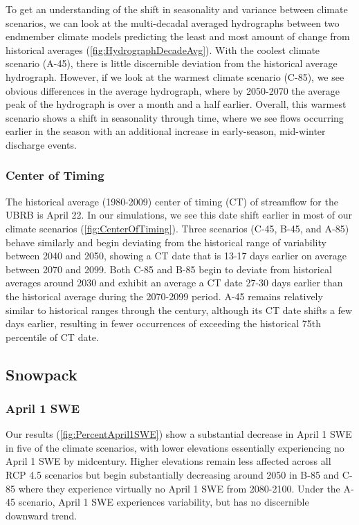 \documentclass[water,article,submit,moreauthors,pdftex,10pt,a4paper]{mdpi}
\theoremstyle{mdpi}
\newcounter{ex}
\newcounter{re}
\theoremstyle{mdpidefinition}
\begin{document}
To get an understanding of the shift in seasonality and variance between climate scenarios, we can look at the multi-decadal averaged hydrographs between two endmember climate models predicting the least and most amount of change from historical averages (\cref{fig:HydrographDecadeAvg}). With the coolest climate scenario (A-45), there is little discernible deviation from the historical average hydrograph. However, if we look at the warmest climate scenario (C-85), we see obvious differences in the average hydrograph, where by 2050-2070 the average peak of the hydrograph is over a month and a half earlier. Overall, this warmest scenario shows a shift in seasonality through time, where we see flows occurring earlier in the season with an additional increase in early-season, mid-winter discharge events.

\subsubsection{Center of Timing}

The historical average (1980-2009) center of timing (CT) of streamflow for the UBRB is April 22. In our simulations, we see this date shift earlier in most of our climate scenarios (\cref{fig:CenterOfTiming}). Three scenarios (C-45, B-45, and A-85) behave similarly and begin deviating from the historical range of variability between 2040 and 2050, showing a CT date that is 13-17 days earlier on average between 2070 and 2099. Both C-85 and B-85 begin to deviate from historical averages around 2030 and exhibit an average a CT date 27-30 days earlier than the historical average during the 2070-2099 period. A-45 remains relatively similar to historical ranges through the century, although its CT date shifts a few days earlier, resulting in fewer occurrences of exceeding the historical 75th percentile of CT date. 

\subsection{Snowpack}

\subsubsection{April 1 SWE}

Our results (\cref{fig:PercentApril1SWE}) show a substantial decrease in April 1 SWE in five of the climate scenarios, with lower elevations essentially experiencing no April 1 SWE by midcentury. Higher elevations remain less affected across all RCP 4.5 scenarios but begin substantially decreasing around 2050 in B-85 and C-85 where they experience virtually no April 1 SWE from 2080-2100. Under the A-45 scenario, April 1 SWE experiences variability, but has no discernible downward trend. 
\end{document}
